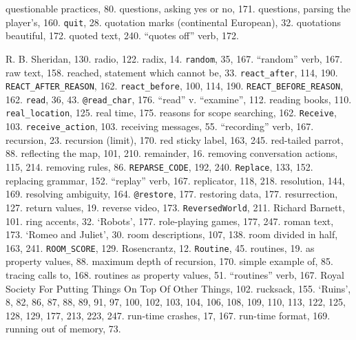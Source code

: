 questionable practices, 80.
questions, asking yes or no, 171.
questions, parsing the player's, 160.
{{\tt quit}}, 28.
quotation marks (continental European), 32.
quotations beautiful, 172.
quoted text, 240.
``quotes off'' verb, 172.

R. B. Sheridan, 130.
radio, 122.
radix, 14.
{{\tt random}}, 35, 167.
``random'' verb, 167.
raw text, 158.
reached, statement which cannot be, 33.
{{\tt react\_after}}, 114, 190.
{{\tt REACT\_AFTER\_REASON}}, 162.
{{\tt react\_before}}, 100, 114, 190.
{{\tt REACT\_BEFORE\_REASON}}, 162.
{{\tt read}}, 36, 43.
{{\tt @read\_char}}, 176.
``read'' v. ``examine'', 112.
reading books, 110.
{{\tt real\_location}}, 125.
real time, 175.
reasons for scope searching, 162.
{{\tt Receive}}, 103.
{{\tt receive\_action}}, 103.
receiving messages, 55.
``recording'' verb, 167.
recursion, 23.
recursion (limit), 170.
red sticky label, 163, 245.
red-tailed parrot, 88.
reflecting the map, 101, 210.
remainder, 16.
removing conversation actions, 115, 214.
removing rules, 86.
{{\tt REPARSE\_CODE}}, 192, 240.
{{\tt Replace}}, 133, 152.
replacing grammar, 152.
``replay'' verb, 167.
replicator, 118, 218.
resolution, 144, 169.
resolving ambiguity, 164.
{{\tt @restore}}, 177.
restoring data, 177.
resurrection, 127.
return values, 19.
reverse video, 173.
{{\tt ReversedWorld}}, 211.
Richard Barnett, 101.
ring accents, 32.
`Robots', 177.
role-playing games, 177, 247.
roman text, 173.
`Romeo and Juliet', 30.
room descriptions, 107, 138.
room divided in half, 163, 241.
{{\tt ROOM\_SCORE}}, 129.
Rosencrantz, 12.
{{\tt Routine}}, 45.
routines, 19.
\quad  as property values, 88.
\quad  maximum depth of recursion, 170.
\quad  simple example of, 85.
\quad  tracing calls to, 168.
routines as property values, 51.
``routines'' verb, 167.
Royal Society For Putting Things On Top Of Other Things, 102.
rucksack, 155.
`Ruins', 8, 82, 86, 87, 88, 89, 91, 97, 100, 102, 103, 104, 106, 108, 109, 110, 113, 122, 125, 128, 129, 177, 213, 223, 247.
run-time crashes, 17, 167.
run-time format, 169.
running out of memory, 73.

